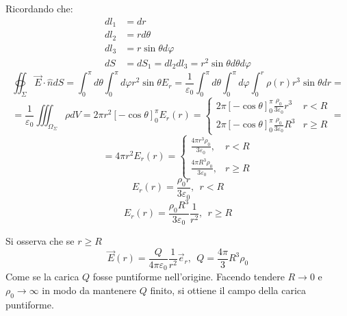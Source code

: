 Ricordando che:
\begin{align*}
dl_1 &= dr \\
dl_2 &= rd\theta \\
dl_3 &= r\sin\theta d\varphi \\
dS &= dS_1 = dl_2dl_3 = r^2\sin\theta d\theta d \varphi
\end{align*}
$$
\oiint_\Sigma\vec{E}\cdot\hat{n}dS = \int_0^\pi d\theta \int_0^\pi d\varphi r^2 \sin\theta E_r = 
\frac{1}{\varepsilon_0} \int_0^\pi d\theta \int_0^\pi d\varphi \int_0^r \rho(r) r^3\sin\theta dr =
$$
$$
= \frac{1}{\varepsilon_0}\iiint_{\Omega_\Sigma} \rho d V = 2\pi r^2 \left[- \cos \theta\right]_0 ^\pi 
E_r (r) = 
\begin{cases}
  2 \pi [-\cos\theta]_0^\pi \frac{\rho_0}{3\varepsilon_0}r^3 & r<R \\
  2 \pi [-\cos \theta]_0^\pi \frac{\rho_0}{3\varepsilon_0}R^3 & r \geq R
\end{cases} =
$$
$$
= 4 \pi r^2 E_r(r) = \begin{cases}
\frac{4\pi r^3 \rho_0}{3\varepsilon_0}, & r < R \\
\frac{4\pi R^3 \rho_0}{3\varepsilon_0}, & r \geq R
\end{cases}
$$
$$
E_r(r) = \frac{\rho_0 r}{3 \varepsilon_0}, \ \ r < R
$$
$$
E_r(r) = \frac{\rho_0 R^3}{3 \varepsilon_0}\frac{1}{r^2}, \ \ r \geq R
$$
\begin{center} %
\end{center}
Si osserva che se $r\geq R$ 
$$
\vec{E}(r) = \frac{Q}{4\pi\varepsilon_0} \frac{1}{r^2} \vec{e}_r,\ \ Q = \frac{4\pi }{3}R^3\rho_0
$$
Come se la carica $Q$ fosse puntiforme nell'origine.
Facendo tendere $R\to 0 $ e $\rho_0 \to \infty$ in modo da mantenere $Q$ finito, si ottiene
il campo della carica puntiforme.

